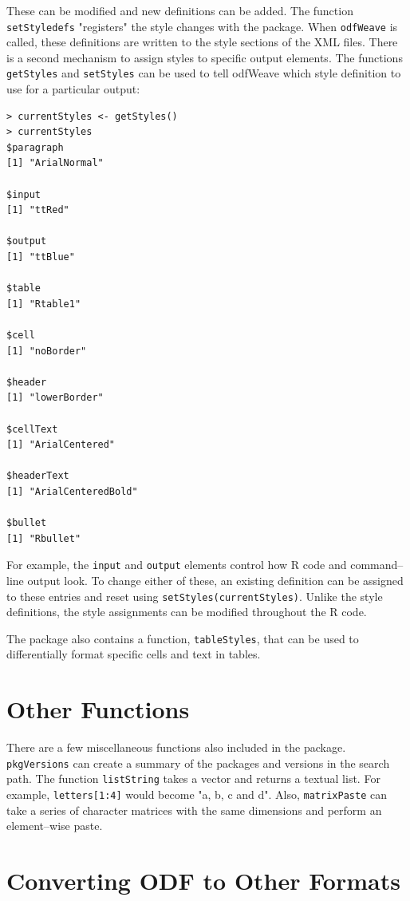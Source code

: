 \documentclass[12pt]{article}
\newcommand{\odfWeaveFunc}{{\tt odfWeave}\xspace}
\begin{document}
These can be modified and new definitions can be added. The function \texttt{setStyledefs} "registers" the style changes with the package. When \odfWeaveFunc is called, these definitions are written to the style sections of the XML files. There is a second mechanism to assign styles to specific output elements. The functions \texttt{getStyles} and \texttt{setStyles} can be used to tell odfWeave which style definition to use for a particular output:

\begin{verbatim}
> currentStyles <- getStyles()
> currentStyles
$paragraph
[1] "ArialNormal"

$input
[1] "ttRed"

$output
[1] "ttBlue"

$table
[1] "Rtable1"

$cell
[1] "noBorder"

$header
[1] "lowerBorder"

$cellText
[1] "ArialCentered"

$headerText
[1] "ArialCenteredBold"

$bullet
[1] "Rbullet"
\end{verbatim}

For example, the \texttt{input} and \texttt{output} elements control how R code and command--line output look. To change either of these, an existing definition can be assigned to these entries and reset using \verb|setStyles(currentStyles)|. Unlike the style definitions, the style assignments can be modified throughout the R code. 

The package also contains a function, \texttt{tableStyles}, that can be used to differentially format specific cells and text in tables.

\section{Other Functions} 

There are a few miscellaneous functions also included in the package. \texttt{pkgVersions} can create a summary of the packages and versions in the search path. The function \texttt{listString} takes a vector and returns a textual list. For example,  \verb|letters[1:4]| would become "a, b, c and d". Also, \texttt{matrixPaste} can take a series of character matrices with the same dimensions and perform an element--wise paste.

\section{Converting ODF to Other Formats}
\end{document}

